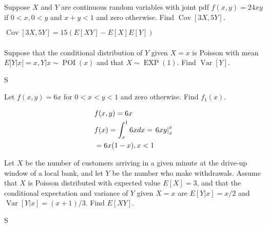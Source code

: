 \documentclass[answers]{exam}
\begin{document}
\begin{questions}
\question 
Suppose $X$ and $Y$ are continuous random variables with joint pdf \(f(x,y) = 24xy\)
if \(0<x,0<y\) and \(x+y<1\) and zero otherwise. Find \(\operatorname{Cov}[3X,5Y]\).
\begin{solution}
	\(\operatorname{Cov}[3X,5Y] = 15 (E[XY]-E[X]E[Y]) \)
	\begin{align*}
		
	\end{align*}
\end{solution}

\question 
Suppose that the conditional distribution of $Y$ given $X=x$ is Poisson with mean 
\(E[Y|x] = x , Y|x\sim\operatorname{POI}(x)\) and that \(X\sim\operatorname{EXP}(1)\). Find \(\operatorname{Var}[Y]\).
\begin{solution}
	S
\end{solution}

\question 
Let \(f(x,y) = 6x\) for \(0<x<y<1\) and zero otherwise. Find \(f_1(x)\).
\begin{solution}
	\begin{align*}
		& f(x,y) = 6x \\
		& f(x) = \int_{x}^{1} 6x dx = \left. 6xy \right|_x^x \\ 
		&= 6x(1-x), \vspace{2em} x<1 
	\end{align*}
\end{solution}

\question 
Let $X$ be the number of customers arriving in a given minute at the drive-up window of a local bank, and let $Y$ be the number who make withdrawals. Assume that $X$ is Poisson distributed with expected value \(E[X]=3\), and that the conditional expectation and variance of $Y$ given \(X=x\) are \(E[Y|x] = x/2\) and \(\operatorname{Var}[Y|x]=(x+1)/3\). Find \(E[XY]\).
\begin{solution}
	S
\end{solution}


\end{questions}
\end{document}

